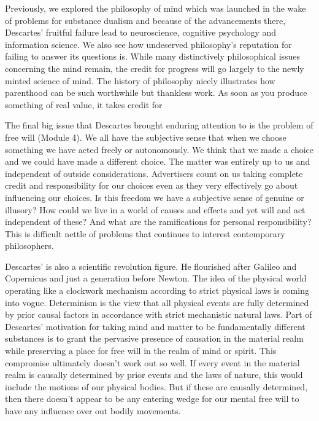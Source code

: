Previously, we explored the philosophy of mind which was  launched in the wake of problems for substance dualism and because of the advancements there, Descartes' fruitful failure lead to neuroscience, cognitive psychology and information science. We also see how undeserved philosophy’s reputation for failing to answer its questions is. While many distinctively philosophical issues concerning the mind remain, the credit for progress will go largely to the newly minted science of mind. The history of philosophy nicely illustrates how parenthood can be such worthwhile but thankless work. As soon as you produce something of real value, it takes credit for 

The final big issue that Descartes brought enduring attention to is the problem of free will (Module 4). We all have the subjective sense that when we choose something we have acted freely or autonomously. We think that we made a choice and we could have made a different choice. The matter was entirely up to us and independent of outside considerations. Advertisers count on us taking complete credit and responsibility for our choices even as they very effectively go about influencing our choices. Is this freedom we have a subjective sense of genuine or illusory? How could we live in a world of causes and effects and yet will and act independent of these? And what are the ramifications for personal responsibility? This is difficult nettle of problems that continues to interest contemporary philosophers.

Descartes’ is also a scientific revolution figure. He flourished after Galileo and Copernicus and just a generation before Newton. The idea of the physical world operating like a clockwork mechanism according to strict physical laws is coming into vogue. Determinism is the view that all physical events are fully determined by prior causal factors in accordance with strict mechanistic natural laws. Part of Descartes’ motivation for taking mind and matter to be fundamentally different substances is to grant the pervasive presence of causation in the material realm while preserving a place for free will in the realm of mind or spirit. This compromise ultimately doesn’t work out so well. If every event in the material realm is causally determined by prior events and the laws of nature, this would include the motions of our physical bodies. But if these are causally determined, then there doesn’t appear to be any entering wedge for our mental free will to have any influence over out bodily movements.

